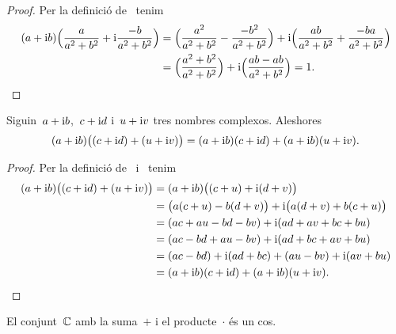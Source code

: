 \documentclass[../Apunts.tex]{subfiles}
\begin{document}
	\begin{proof}
		Per la definició de~ tenim
		\begin{align*}
			(a+\mathrm{i} b)\Big(\frac{a}{a^{2}+b^{2}}+\mathrm{i}\frac{-b}{a^{2}+b^{2}}\Big)&=\Big(\frac{a^{2}}{a^{2}+b^{2}}-\frac{-b^{2}}{a^{2}+b^{2}}\Big)+\mathrm{i}\Big(\frac{ab}{a^{2}+b^{2}}+\frac{-ba}{a^{2}+b^{2}}\Big) \\
			&=\Big(\frac{a^{2}+b^{2}}{a^{2}+b^{2}}\Big)+\mathrm{i}\Big(\frac{ab-ab}{a^{2}+b^{2}}\Big)=1.\qedhere
		\end{align*}
	\end{proof}
	\begin{proposition}
		\label{prop:distribuitva del producte respecte la suma de nombres complexos}
		Siguin~\(a+\mathrm{i} b\),~\(c+\mathrm{i} d\) i~\(u+\mathrm{i} v\) tres nombres complexos. Aleshores
		\[(a+\mathrm{i} b)\big((c+\mathrm{i} d)+(u+\mathrm{i} v)\big)=(a+\mathrm{i} b)(c+\mathrm{i} d)+(a+\mathrm{i} b)(u+\mathrm{i} v).\]
	\end{proposition}
	\begin{proof}
		Per la definició de~ i~ tenim
		\begin{align*}
			(a+\mathrm{i} b)\big((c+\mathrm{i} d)+(u+\mathrm{i} v)\big)&=(a+\mathrm{i} b)\big((c+u)+\mathrm{i}(d+v)\big) \\
			&=\big(a(c+u)-b(d+v)\big)+\mathrm{i}\big(a(d+v)+b(c+u)\big) \\
			&=(ac+au-bd-bv)+\mathrm{i}(ad+av+bc+bu) \\
			&=(ac-bd+au-bv)+\mathrm{i}(ad+bc+av+bu)\\
			&=(ac-bd)+\mathrm{i}(ad+bc)+(au-bv)+\mathrm{i}(av+bu) \\
			&=(a+\mathrm{i} b)(c+\mathrm{i} d)+(a+\mathrm{i} b)(u+\mathrm{i} v).\qedhere
		\end{align*}
	\end{proof}
	\begin{corollary}
		\label{cor:els complexos formen un cos}
		El conjunt~\(\mathbb{C}\) amb la suma~\(+\) i el producte~\(\cdot\) és un cos.
	\end{corollary}
\end{document}

